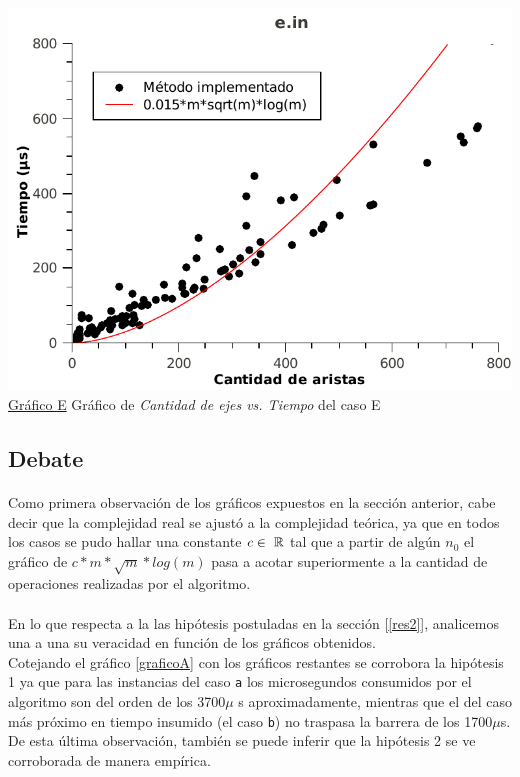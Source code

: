 \begin{center}
\vspace*{1.5cm}
\label{graficoE}
\hspace*{-2.1cm}\includegraphics[scale = 0.9]{../ej2/pruebas_graficos/GraphE.pdf} \\
\underline{Gráfico E} Gráfico de \textit{Cantidad de ejes vs. Tiempo} del caso E
\end{center}

\clearpage 


\subsection{Debate}
\label{deb2}

\paragraph{}
Como primera observación de los gráficos expuestos en la sección anterior, cabe decir que la complejidad real se ajustó a la complejidad teórica, ya que en todos los casos se pudo hallar una constante $c \in\ \mathbb{R}$ tal que a partir de algún $n_0$ el gráfico de $c*m*\sqrt{m}*log(m)$ pasa a acotar superiormente a la cantidad de operaciones realizadas por el algoritmo.

\paragraph{}
En lo que respecta a la las hipótesis postuladas en la sección [\ref{res2}], analicemos una a una su veracidad en función de los gráficos obtenidos.\\
Cotejando el gráfico \ref{graficoA} con los gráficos restantes se corrobora la hipótesis 1 ya que para las instancias del caso \texttt{a} los microsegundos consumidos por el algoritmo son del orden de los 3700$\mu$ s aproximadamente, mientras que el del caso más próximo en tiempo insumido (el caso \texttt{b}) no traspasa la barrera de los 1700$\mu$s.\\
De esta última observación, también se puede inferir que la hipótesis 2 se ve corroborada de manera empírica.

